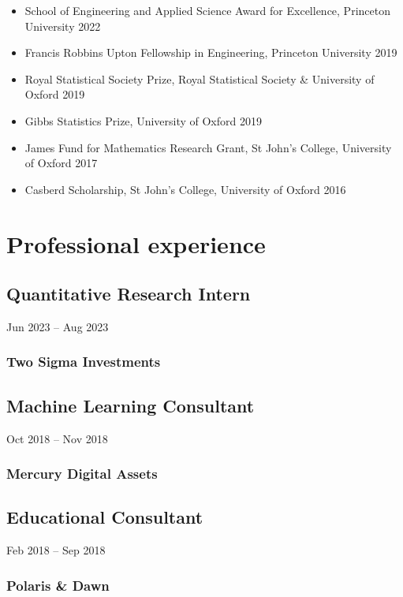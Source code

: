 \documentclass{wgu-cv}
\begin{document}
\begin{itemize}
  \item School of Engineering and Applied Science Award for Excellence,
    Princeton University
    \hfill 2022%
  \item Francis Robbins Upton Fellowship in Engineering,
    Princeton University
    \hfill 2019%
  \item Royal Statistical Society Prize,
    Royal Statistical Society \& University of Oxford
    \hfill 2019%
  \item Gibbs Statistics Prize,
    University of Oxford
    \hfill 2019%
  \item James Fund for Mathematics Research Grant,
    St John's College, University of Oxford
    \hfill 2017%
  \item Casberd Scholarship,
    St John's College, University of Oxford
    \hfill 2016%
\end{itemize}

\vspace{0.1cm}
\section{Professional experience}

\subsection{Quantitative Research Intern}
{Jun 2023 -- Aug 2023}
\subsubsection{Two Sigma Investments}
\vspace{-0.20cm}

\subsection{Machine Learning Consultant}
{Oct 2018 -- Nov 2018}
\subsubsection{Mercury Digital Assets}
\vspace{-0.18cm}

\subsection{Educational Consultant}
{Feb 2018 -- Sep 2018}
\subsubsection{Polaris \& Dawn}
\vspace{-0.20cm}
\end{document}
